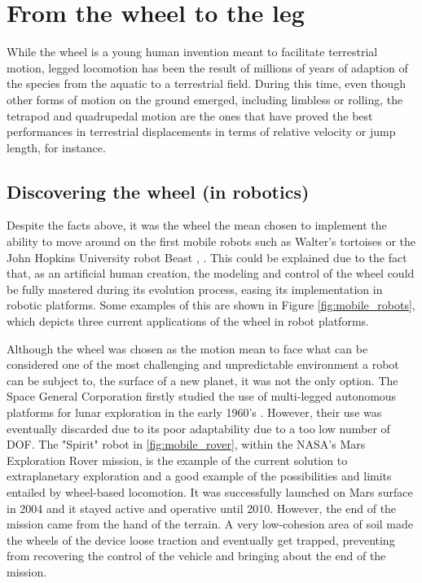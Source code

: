 
\section{From the wheel to the leg} %
\label{sec:from_the_wheel_to_the_leg}
While the wheel is a young human invention meant to facilitate terrestrial motion, legged locomotion has been the result of millions of years of adaption of the species from the aquatic to a terrestrial field.
During this time, even though other forms of motion on the ground emerged, including limbless or rolling, the tetrapod and quadrupedal motion are the ones that have proved the best performances in terrestrial displacements in terms of relative velocity or jump length, for instance.

\subsection{Discovering the wheel (in robotics)} %
\label{sub:the_wheel_in_robotics}
Despite the facts above, it was the wheel the mean chosen to implement the ability to move around on the first mobile robots such as Walter's tortoises or the John Hopkins University robot Beast \cite{first_mobile_robot}, \cite{second_mobile_robot}.
This could be explained due to the fact that, as an artificial human creation, the modeling and control of the wheel could be fully mastered during its evolution process, easing its implementation in robotic platforms.
Some examples of this are shown in Figure \ref{fig:mobile_robots}, which depicts three current applications of the wheel in robot platforms.

Although the wheel was chosen as the motion mean to face what can be considered one of the most challenging and unpredictable environment a robot can be subject to, the surface of a new planet, it was not the only option. 
The Space General Corporation firstly studied the use of multi-legged autonomous platforms for lunar exploration in the early 1960's \cite{legged_mot_history1}.
However, their use was eventually discarded due to its poor adaptability due to a too low number of DOF.
The "Spirit" robot in \ref{fig:mobile_rover}, within the NASA's Mars Exploration Rover mission, is the example of the current solution to extraplanetary exploration and a good example of the possibilities and limits entailed by wheel-based locomotion.
It was successfully launched on Mars surface in 2004 and it stayed active and operative until 2010.
However, the end of the mission came from the hand of the terrain. 
A very low-cohesion area of soil made the wheels of the device loose traction and eventually get trapped, preventing from recovering the control of the vehicle and bringing about the end of the mission.

